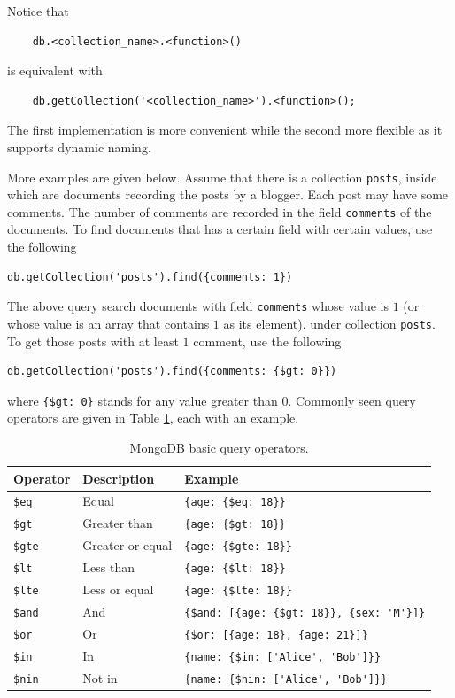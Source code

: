 \begin{shortbox}
Notice that
\begin{lstlisting}
	db.<collection_name>.<function>()
\end{lstlisting}
is equivalent with
\begin{lstlisting}
	db.getCollection('<collection_name>').<function>();
\end{lstlisting}
The first implementation is more convenient while the second more flexible as it supports dynamic naming.
\end{shortbox}

More examples are given below. Assume that there is a collection \verb|posts|, inside which are documents recording the posts by a blogger. Each post may have some comments. The number of comments are recorded in the field \verb|comments| of the documents. To find documents that has a certain field with certain values, use the following
\begin{lstlisting}
db.getCollection('posts').find({comments: 1})
\end{lstlisting}
The above query search documents with field \verb|comments| whose value is $1$ (or whose value is an array that contains $1$ as its element). under collection \verb|posts|. To get those posts with at least $1$ comment, use the following
\begin{lstlisting}
db.getCollection('posts').find({comments: {$gt: 0}})
\end{lstlisting}
where \verb|{$gt: 0}| stands for any value greater than $0$. Commonly seen query operators are given in Table \ref{ch:db:tab:mongodbqueryoperator}, each with an example.

\begin{table}
	\centering \caption{MongoDB basic query operators.} \label{ch:db:tab:mongodbqueryoperator}
	\begin{tabularx}{\textwidth}{llX}
		\hline
		Operator & Description & Example \\ \hline
		\verb|$eq| & Equal & \verb|{age: {$eq: 18}}| \\ 
		\verb|$gt| & Greater than & \verb|{age: {$gt: 18}}| \\ 
		\verb|$gte| & Greater or equal & \verb|{age: {$gte: 18}}| \\ 
		\verb|$lt| & Less than & \verb|{age: {$lt: 18}}| \\ 
		\verb|$lte| & Less or equal & \verb|{age: {$lte: 18}}| \\ 
		\verb|$and| & And & \verb|{$and: [{age: {$gt: 18}}, {sex: 'M'}]}| \\ 
		\verb|$or| & Or &  \verb|{$or: [{age: 18}, {age: 21}]}| \\ 
		\verb|$in| & In & \verb|{name: {$in: ['Alice', 'Bob']}}| \\ 
		\verb|$nin| & Not in & \verb|{name: {$nin: ['Alice', 'Bob']}}| \\
		\hline
	\end{tabularx}
\end{table}

